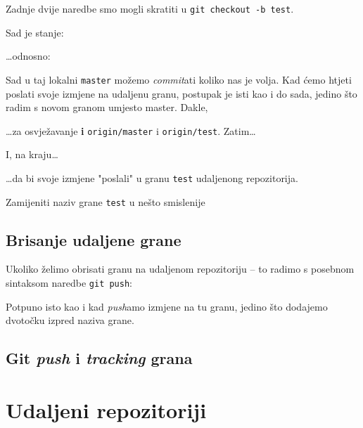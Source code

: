 
Zadnje dvije naredbe smo mogli skratiti u \verb+git checkout -b test+.

Sad je stanje:



\dots{}odnosno:



Sad u taj lokalni \verb+master+ možemo \emph{commit}ati koliko nas je volja.
Kad ćemo htjeti poslati svoje izmjene na udaljenu granu, postupak je isti kao i do sada, jedino što radim s novom granom umjesto master.
Dakle,


\dots{}za osvježavanje \textbf{i} \verb+origin/master+ i \verb+origin/test+.
Zatim\dots


I, na kraju\dots


\dots{}da bi svoje izmjene "poslali" u granu \verb+test+ udaljenong repozitorija.

\TODO Zamijeniti naziv grane \verb+test+ u nešto smislenije

\subsection*{Brisanje udaljene grane}

Ukoliko želimo obrisati granu na udaljenom repozitoriju -- to radimo s posebnom sintaksom naredbe \verb+git push+:


Potpuno isto kao i kad \emph{push}amo izmjene na tu granu, jedino što dodajemo dvotočku izpred naziva grane.

\subsection*{Git \emph{push} i \emph{tracking} grana}

\TODO

\section*{Udaljeni repozitoriji}

